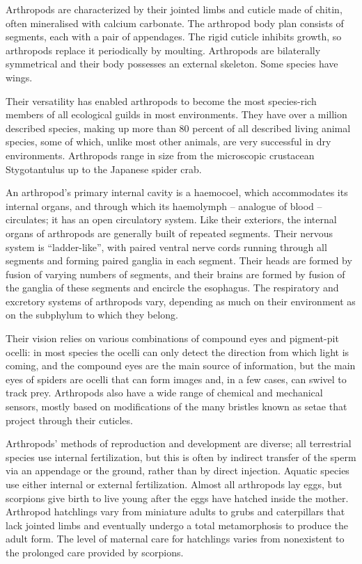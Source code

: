 Arthropods are characterized by their jointed limbs and cuticle made of chitin, often mineralised with calcium carbonate. The arthropod body plan consists of segments, each with a pair of appendages. The rigid cuticle inhibits growth, so arthropods replace it periodically by moulting. Arthropods are bilaterally symmetrical and their body possesses an external skeleton. Some species have wings.

Their versatility has enabled arthropods to become the most species-rich members of all ecological guilds in most environments. They have over a million described species, making up more than 80 percent of all described living animal species, some of which, unlike most other animals, are very successful in dry environments. Arthropods range in size from the microscopic crustacean Stygotantulus up to the Japanese spider crab.

An arthropod's primary internal cavity is a haemocoel, which accommodates its internal organs, and through which its haemolymph -- analogue of blood -- circulates; it has an open circulatory system. Like their exteriors, the internal organs of arthropods are generally built of repeated segments. Their nervous system is ``ladder-like'', with paired ventral nerve cords running through all segments and forming paired ganglia in each segment. Their heads are formed by fusion of varying numbers of segments, and their brains are formed by fusion of the ganglia of these segments and encircle the esophagus. The respiratory and excretory systems of arthropods vary, depending as much on their environment as on the subphylum to which they belong.

Their vision relies on various combinations of compound eyes and pigment-pit ocelli: in most species the ocelli can only detect the direction from which light is coming, and the compound eyes are the main source of information, but the main eyes of spiders are ocelli that can form images and, in a few cases, can swivel to track prey. Arthropods also have a wide range of chemical and mechanical sensors, mostly based on modifications of the many bristles known as setae that project through their cuticles.

Arthropods' methods of reproduction and development are diverse; all terrestrial species use internal fertilization, but this is often by indirect transfer of the sperm via an appendage or the ground, rather than by direct injection. Aquatic species use either internal or external fertilization. Almost all arthropods lay eggs, but scorpions give birth to live young after the eggs have hatched inside the mother. Arthropod hatchlings vary from miniature adults to grubs and caterpillars that lack jointed limbs and eventually undergo a total metamorphosis to produce the adult form. The level of maternal care for hatchlings varies from nonexistent to the prolonged care provided by scorpions.

